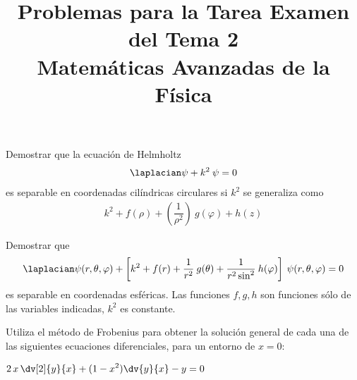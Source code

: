 
\title{Problemas para  la Tarea Examen del Tema 2 \\ \large{Matemáticas Avanzadas de la Física}\vspace{-3ex}}
\date{ }

\renewcommand\labelenumii{\theenumi.{\arabic{enumii}}}
\maketitle
\fontsize{14}{14}\selectfont
\begin{milista}
\item Demostrar que la ecuación de Helmholtz
\begin{align*}
\laplacian \psi + k^{2} \: \psi = 0
\end{align*}
es separable en coordenadas cilíndricas circulares si $k^{2}$ se generaliza como
\begin{align*}
k^{2} + f(\rho) + \left( \dfrac{1}{\rho^{2}} \right) \: g(\varphi) + h(z)
\end{align*}
\item Demostrar que
\begin{align*}
\laplacian \psi (r, \theta, \varphi) + \left[ k^{2} + f(r) + \dfrac{1}{r^{2}} \: g(\theta) + \dfrac{1}{r^{2} \sin^{2}} \: h(\varphi) \right] \: \psi (r, \theta, \varphi) = 0
\end{align*}
es separable en coordenadas esféricas. Las funciones $f, g, h$ son funciones sólo de las variables indicadas, $k^{2}$ es constante.
\item Utiliza el método de Frobenius para obtener la solución general de cada una de las siguientes ecuaciones diferenciales, para un entorno de $x = 0$:
\begin{milista}
\begin{fleqn}
\setlength\itemsep{1em}
\item  $ \displaystyle 2 \, x \, \dv[2]{y}{x} + (1 - x^{2}) \dv{y}{x} - y = 0 $

\end{fleqn}
\end{milista}
\end{milista}
